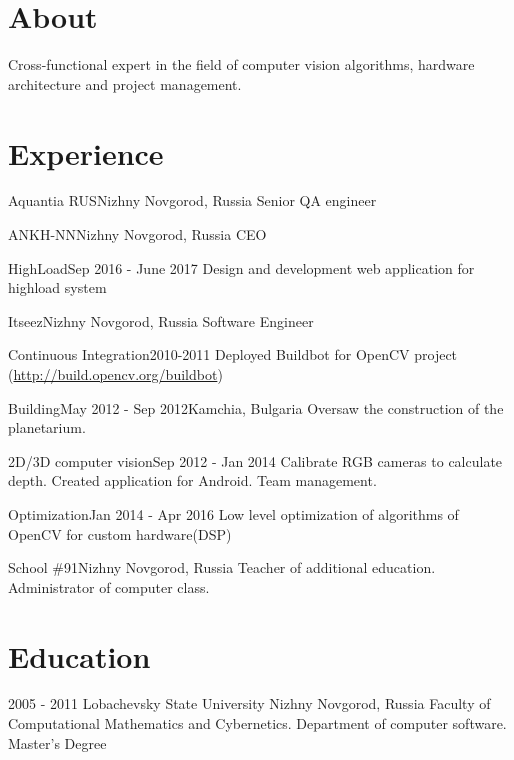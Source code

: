 \documentclass[11pt,a4paper]{moderncv}
\begin{document}
\maketitle

\section{About}
Cross-functional expert in the field of computer vision algorithms, hardware architecture and project management.

\section{Experience}
	{Aquantia RUS}{Nizhny Novgorod, Russia}{}{}
  	{Senior QA engineer}
  

	{ANKH-NN}{Nizhny Novgorod, Russia}{}{}
  	{CEO}
  
\cventry{}
	{HighLoad}{Sep 2016 - June 2017}{}{}
	{Design and development web application for highload system}
 
	{Itseez}{Nizhny Novgorod, Russia}{}{}
	{Software Engineer}
  
\cventry{}
	{Continuous Integration}{2010-2011}{}{}
	{Deployed Buildbot for OpenCV project (\url{http://build.opencv.org/buildbot})}

\cventry{}
	{Building}{May 2012 - Sep 2012}{Kamchia, Bulgaria}{}
	{Oversaw the construction of the planetarium.}

\cventry{}
	{2D/3D computer vision}{Sep 2012 - Jan 2014}{} {}
	{Calibrate RGB cameras to calculate depth. Created application for Android. Team management.}

\cventry{}
	{Optimization}{Jan 2014 - Apr 2016}{}{}   
	{Low level optimization of algorithms of OpenCV for custom hardware(DSP)}

	{School \#91}{Nizhny Novgorod, Russia}{}{}
	{Teacher of additional education. Administrator of computer class.}
  
\section{Education}
  \cventry
    {2005 - 2011}
    {Lobachevsky State University}
    {Nizhny Novgorod, Russia}
    {}{}
    {Faculty of Computational Mathematics and Cybernetics. Department of computer software.\newline{}
    Master's Degree}
\end{document}
